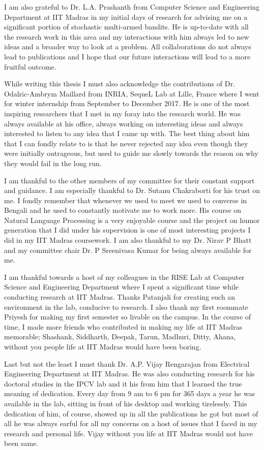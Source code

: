 I am also grateful to Dr. L.A. Prashanth from Computer Science and Engineering Department at IIT Madras in my initial days of research for advising me on a significant portion of stochastic multi-armed bandits. He is up-to-date with all the research work in this area and my interactions with him always led to new ideas and a broader way to look at a problem. All collaborations do not always lead to publications and I hope that our future interactions will lead to a more fruitful outcome.

While writing this thesis I must also acknowledge the contributions of Dr. Odalric-Ambrym Maillard from INRIA, SequeL Lab at Lille, France where I went for winter internship from September to December 2017. He is one of the most inspiring researchers that I met in my foray into the research world. He was always available at his office, always working on interesting ideas and always interested to listen to any idea that I came up with. The best thing about him that I can fondly relate to is that he never rejected any idea even though they were initially outrageous, but used to guide me slowly towards the reason on why they would fail in the long run. 

I am thankful to the other members of my committee for their constant support and guidance. I am especially thankful to Dr.  Sutanu Chakraborti for his trust on me. I fondly remember that whenever we used to meet we used to converse in Bengali and he used to constantly motivate me to work more. His course on Natural Language Processing is a very enjoyable course and the project on humor generation that I did under his supervision is one of most interesting projects I did in my IIT Madras coursework. I am also thankful to my Dr. Nirav P Bhatt and my committee chair Dr. P Sreenivasa Kumar for being always available for me.


I am thankful towards a host of my colleagues in the RISE Lab at Computer Science and Engineering Department where I spent a significant time while conducting research at IIT Madras. Thanks Patanjali for creating such an environment in the lab, conducive to research. I also thank my first roommate Priyesh for making my first semester so livable on the campus. In the course of time, I made more friends who contributed in making my life at IIT Madras memorable; Shashank, Siddharth, Deepak, Tarun, Madhuri, Ditty, Ahana, without you people life at IIT Madras would have been boring.

Last but not the least I must thank Dr. A.P. Vijay Rengarajan from Electrical Engineering Department at IIT Madras. He was also conducting research for his doctoral studies in the IPCV lab and it his from him that I learned the true meaning of dedication. Every day from 9 am to 6 pm for 365 days a year he was available in the lab, sitting in front of his desktop and working tirelessly. This dedication of him, of course, showed up in all the publications he got but most of all he was always earful for all my concerns on a host of issues that I faced in my research and personal life. Vijay without you life at IIT Madras would not have been same.


